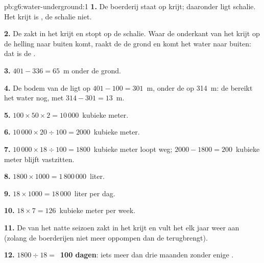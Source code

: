 \begin{solution}{pb:g6:water-underground:1}
\textbf{1.} De boerderij staat op krijt; daaronder ligt schalie. Het krijt
is , de schalie niet.

\textbf{2.} De  zakt in het krijt en stopt op de schalie. Waar de
onderkant van het krijt op de helling naar buiten komt, raakt de
 de grond en komt het water naar buiten: dat is de .

\textbf{3.} $401 - 336 = 65$~m onder de grond.

\textbf{4.} De bodem van de  ligt op $401 - 100 = 301$~m, onder de
 op 314~m: de  bereikt het water nog, met $314 - 301 =
13$~m.

\textbf{5.} $100 \times 50 \times 2 = 10\,000$~kubieke meter.

\textbf{6.} $10\,000 \times 20 \div 100 = 2000$~kubieke meter.

\textbf{7.} $10\,000 \times 18 \div 100 = 1800$~kubieke meter loopt weg;
$2000 - 1800 = 200$~kubieke meter blijft vastzitten.

\textbf{8.} $1800 \times 1000 = 1\,800\,000$~liter.

\textbf{9.} $18 \times 1000 = 18\,000$~liter per dag.

\textbf{10.} $18 \times 7 = 126$~kubieke meter per week.

\textbf{11.} De  van het natte seizoen zakt in het krijt en vult het
elk jaar weer aan (zolang de boerderijen niet meer oppompen dan de 
terugbrengt).

\textbf{12.} $1800 \div 18 = $~\textbf{100 dagen}: iets meer dan drie
maanden zonder enige .
\end{solution}
